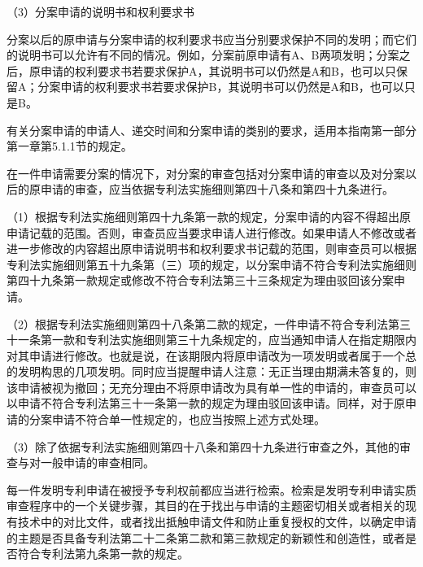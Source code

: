 {\setlength{\parindent}{17.1bp}（3）分案申请的说明书和权利要求书\par}

分案以后的原申请与分案申请的权利要求书应当分别要求保护不同的发明；而它们的说明书可以允许有不同的情况。例如，分案前原申请有A、B两项发明；分案之后，原申请的权利要求书若要求保护A，其说明书可以仍然是A和B，也可以只保留A；分案申请的权利要求书若要求保护B，其说明书可以仍然是A和B，也可以只是B。

有关分案申请的申请人、递交时间和分案申请的类别的要求，适用本指南第一部分第一章第5.1.1节的规定。

在一件申请需要分案的情况下，对分案的审查包括对分案申请的审查以及对分案以后的原申请的审查，应当依据专利法实施细则第四十八条和第四十九条进行。

{\setlength{\parindent}{17.1bp}（1）根据专利法实施细则第四十九条第一款的规定，分案申请的内容不得超出原申请记载的范围。否则，审查员应当要求申请人进行修改。如果申请人不修改或者进一步修改的内容超出原申请说明书和权利要求书记载的范围，则审查员可以根据专利法实施细则第五十九条第（三）项的规定，以分案申请不符合专利法实施细则第四十九条第一款规定或修改不符合专利法第三十三条规定为理由驳回该分案申请。\par}

{\setlength{\parindent}{17.1bp}（2）根据专利法实施细则第四十八条第二款的规定，一件申请不符合专利法第三十一条第一款和专利法实施细则第三十九条规定的，应当通知申请人在指定期限内对其申请进行修改。也就是说，在该期限内将原申请改为一项发明或者属于一个总的发明构思的几项发明。同时应当提醒申请人注意：无正当理由期满未答复的，则该申请被视为撤回；无充分理由不将原申请改为具有单一性的申请的，审查员可以以申请不符合专利法第三十一条第一款的规定为理由驳回该申请。同样，对于原申请的分案申请不符合单一性规定的，也应当按照上述方式处理。\par}

{\setlength{\parindent}{17.1bp}（3）除了依据专利法实施细则第四十八条和第四十九条进行审查之外，其他的审查与对一般申请的审查相同。\par}

每一件发明专利申请在被授予专利权前都应当进行检索。检索是发明专利申请实质审查程序中的一个关键步骤，其目的在于找出与申请的主题密切相关或者相关的现有技术中的对比文件，或者找出抵触申请文件和防止重复授权的文件，以确定申请的主题是否具备专利法第二十二条第二款和第三款规定的新颖性和创造性，或者是否符合专利法第九条第一款的规定。

